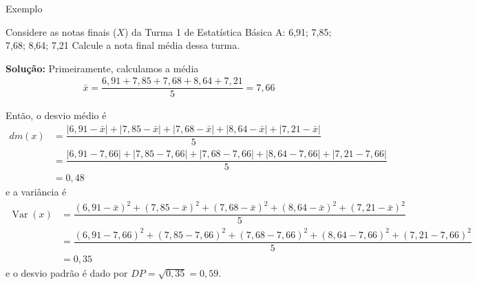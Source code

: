 \documentclass[8pt]{beamer}
\DeclareMathOperator{\vari}{Var}
\begin{document}
\begin{frame}{Exemplo}

{\small
   Considere as notas finais ($X$) da Turma 1 de Estatística Básica A: 6,91; 7,85; 7,68; 8,64; 7,21 Calcule a nota final média dessa turma.
   \vfill
   
   \textbf{Solução:} Primeiramente, calculamos a média
   \begin{align*}
    \bar{x} = \dfrac{6,91+ 7,85+ 7,68 +8,64 +7,21}{5} = 7,66
   \end{align*}
   
   
   Então, o desvio médio é 
   \begin{align*}
    dm(x) &= \dfrac{\left\vert6,91 -\bar{x}\right\vert+\left\vert7,85-\bar{x}\right\vert+ \left\vert7,68-\bar{x}\right\vert+ 
    \left\vert8,64-\bar{x}\right\vert+ \left\vert7,21-\bar{x}\right\vert}{5}\\
    &= \dfrac{\left\vert6,91 -7,66\right\vert+\left\vert7,85-7,66\right\vert+ \left\vert7,68-7,66\right\vert+ 
    \left\vert8,64-7,66\right\vert+ \left\vert7,21-7,66\right\vert}{5} \\
    &= 0,48
   \end{align*}
  e a variância é 
  \begin{align*}
   \vari(x) &= \dfrac{(6,91 -\bar{x})^2+(7,85-\bar{x})^2+ (7,68-\bar{x})^2+ 
    (8,64-\bar{x})^2+ (7,21-\bar{x})^2}{5} \\
    &= \dfrac{(6,91 -7,66)^2+(7,85-7,66)^2+ (7,68-7,66)^2+ 
    (8,64-7,66)^2+ (7,21-7,66)^2}{5}\\
    &= 0,35
  \end{align*}
 e o desvio padrão é dado por $DP=\sqrt{0,35} = 0,59$.

}
\end{frame}
\end{document}
